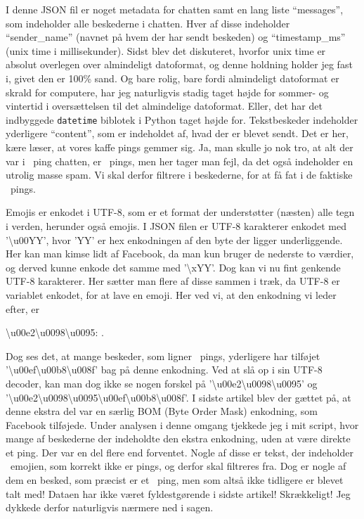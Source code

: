 \begin{article}
I denne JSON fil er noget metadata for chatten samt en lang liste ``messages'', som indeholder alle beskederne i chatten. Hver af disse indeholder ``sender\_name'' (navnet på hvem der har sendt beskeden) og ``timestamp\_ms'' (unix time i millisekunder). Sidst blev det diskuteret, hvorfor unix time er absolut overlegen over almindeligt datoformat, og denne holdning holder jeg fast i, givet den er 100\% sand.
Og bare rolig, bare fordi almindeligt datoformat er skrald for computere, har jeg naturligvis stadig taget højde for sommer- og vintertid i oversættelsen til det almindelige datoformat. Eller, det har det indbyggede \texttt{datetime} biblotek i Python taget højde for.
Tekstbeskeder indeholder yderligere ``content'', som er indeholdet af, hvad der er blevet sendt. Det er her, kære læser, at vores kaffe pings gemmer sig. Ja, man skulle jo nok tro, at alt der var i \coffee\ ping chatten, er \coffee\ pings, men her tager man fejl, da det også indeholder en utrolig masse spam. Vi skal derfor filtrere i beskederne, for at få fat i de faktiske \coffee\ pings.

Emojis er enkodet i UTF-8, som er et format der understøtter (næsten) alle tegn i verden, herunder også emojis. I JSON filen er UTF-8 karakterer enkodet med '\textbackslash u00YY', hvor 'YY' er hex enkodningen af den byte der ligger underliggende. Her kan man kimse lidt af Facebook, da man kun bruger de nederste to værdier, og derved kunne enkode det samme med '\textbackslash xYY'.
Dog kan vi nu fint genkende UTF-8 karakterer. Her sætter man flere af disse sammen i træk, da UTF-8 er variablet enkodet, for at lave en emoji. Her ved vi, at den enkodning vi leder efter, er
\begin{center}
	\textbackslash u00e2\textbackslash u0098\textbackslash u0095: \coffee \; .
\end{center}
Dog ses det, at mange beskeder, som ligner \coffee\ pings, yderligere har tilføjet '\textbackslash u00ef\textbackslash u00b8\textbackslash u008f' bag på denne enkodning. Ved at slå op i sin UTF-8 decoder, kan man dog ikke se nogen forskel på '\textbackslash u00e2\textbackslash u0098\textbackslash u0095' og '\textbackslash u00e2\textbackslash u0098\textbackslash u0095\textbackslash u00ef\textbackslash u00b8\textbackslash u008f'. I sidste artikel blev der gættet på, at denne ekstra del var en særlig BOM (Byte Order Mask) enkodning, som Facebook tilføjede.
Under analysen i denne omgang tjekkede jeg i mit script, hvor mange af beskederne der indeholdte den ekstra enkodning, uden at være direkte et ping. Der var en del flere end forventet.
Nogle af disse er tekst, der indeholder \coffee\ emojien, som korrekt ikke er pings, og derfor skal filtreres fra. Dog er nogle af dem en besked, som præcist er et \coffee\ ping, men som altså ikke tidligere er blevet talt med! Dataen har ikke været fyldestgørende i sidste artikel! Skrækkeligt! Jeg dykkede derfor naturligvis nærmere ned i sagen.


\end{article}

